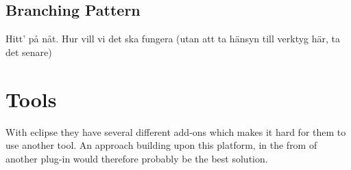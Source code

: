 \documentclass[a4paper,10pt]{article}
\begin{document}


\subsection{Branching Pattern}

Hitt' på nåt.
Hur vill vi det ska fungera (utan att ta hänsyn till verktyg här, ta det senare)

\section{Tools}
With eclipse they have several different add-ons which makes it hard for them to use another tool. An approach building upon this platform, in the from of another plug-in would therefore probably be the best solution.
\end{document}
